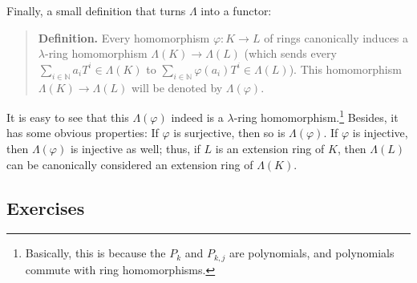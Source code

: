 \documentclass[numbers=enddot,12pt,final,onecolumn,notitlepage]{scrartcl}%
\begin{document}
Finally, a small definition that turns $\Lambda$ into a functor:

\begin{quote}
\textbf{Definition.} Every homomorphism $\varphi:K\rightarrow L$ of rings
canonically induces a $\lambda$-ring homomorphism $\Lambda\left(  K\right)
\rightarrow\Lambda\left(  L\right)  $ (which sends every $\sum\limits_{i\in
\mathbb{N}}a_{i}T^{i}\in\Lambda\left(  K\right)  $ to $\sum\limits_{i\in
\mathbb{N}}\varphi\left(  a_{i}\right)  T^{i}\in\Lambda\left(  L\right)  $).
This homomorphism $\Lambda\left(  K\right)  \rightarrow\Lambda\left(
L\right)  $ will be denoted by $\Lambda\left(  \varphi\right)  $.
\end{quote}

It is easy to see that this $\Lambda\left(  \varphi\right)  $ indeed is a
$\lambda$-ring homomorphism.\footnote{Basically, this is because the $P_{k}$
and $P_{k,j}$ are polynomials, and polynomials commute with ring
homomorphisms.} Besides, it has some obvious properties: If $\varphi$ is
surjective, then so is $\Lambda\left(  \varphi\right)  $. If $\varphi$ is
injective, then $\Lambda\left(  \varphi\right)  $ is injective as well; thus,
if $L$ is an extension ring of $K$, then $\Lambda\left(  L\right)  $ can be
canonically considered an extension ring of $\Lambda\left(  K\right)  $.

\subsection{Exercises}
\end{document}

